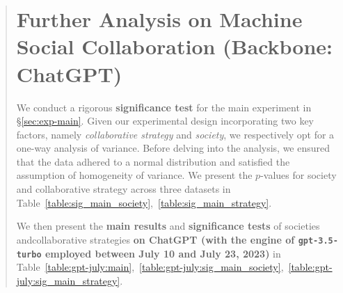 \documentclass[11pt]{article}
\newcommand{\customcomment}[3]{\textcolor{#1}{[#2:#3]}}
\newcommand{\todo}[1]{\customcomment{red}{TODO}{#1}}
\begin{document}
\begin{abstract}

% 




\section{Further Analysis on Machine Social Collaboration (Backbone: ChatGPT)}
\label{app:sig_test_main}

We conduct a rigorous \textbf{significance test} for the main experiment in \S\ref{sec:exp-main}. 
Given our experimental design incorporating two key factors, namely \emph{collaborative strategy} and \emph{society}, we respectively opt for a one-way analysis of variance. 
Before delving into the analysis, we ensured that the data adhered to a normal distribution and satisfied the assumption of homogeneity of variance. 
We present the $p$-values for society and collaborative strategy across three datasets in Table~\ref{table:sig_main_society},~\ref{table:sig_main_strategy}. 

% 
% 

We then present the \textbf{main results} and \textbf{significance tests} of societies andcollaborative strategies \textbf{on ChatGPT (with the engine of \texttt{gpt-3.5-turbo} employed between July 10 and July 23, 2023)} in Table~\ref{table:gpt-july:main},~\ref{table:gpt-july:sig_main_society},~\ref{table:gpt-july:sig_main_strategy}. 






\end{abstract}
\end{document}
